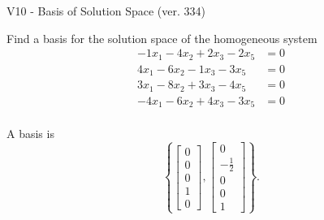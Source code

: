 \begin{exercise}
  \begin{exerciseTitle}V10 - Basis of Solution Space (ver. 334)\end{exerciseTitle}
  \begin{exerciseStatement}
    Find a basis for the solution space of the homogeneous system 
\begin{align*}
 -1 x_ 1 -4 x_ 2 + 2 x_ 3 -2 x_ 5 &= 0  \\ 
  4 x_ 1 -6 x_ 2 -1 x_ 3 -3 x_ 5 &= 0  \\ 
  3 x_ 1 -8 x_ 2 + 3 x_ 3 -4 x_ 5 &= 0  \\ 
  -4 x_ 1 -6 x_ 2 + 4 x_ 3 -3 x_ 5 &= 0  \\ 
 \end{align*}


 
  \end{exerciseStatement}

  \begin{exerciseAnswer}
   A basis is   
\[\left\{\left[\begin{array}{c}
0 \\
0 \\
0 \\
1 \\
0
\end{array}\right] , \left[\begin{array}{c}
0 \\
-\frac{1}{2} \\
0 \\
0 \\
1
\end{array}\right]\right\}.\]

  


  \end{exerciseAnswer}
\end{exercise}